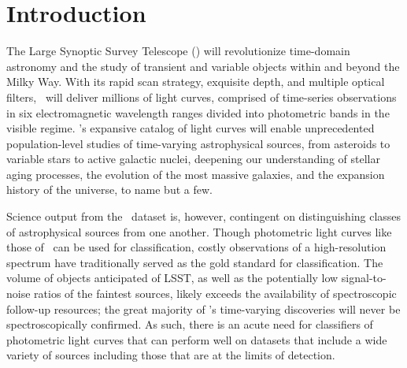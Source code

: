 \section{Introduction}
\label{sec:intro}

The Large Synoptic Survey Telescope (\lsst) will revolutionize time-domain astronomy and the study of transient and variable objects within and beyond the Milky Way.
With its rapid scan strategy, exquisite depth, and multiple optical filters, \lsst\ will deliver millions of light curves, comprised of time-series observations in six electromagnetic wavelength ranges divided into photometric bands in the visible regime.
\lsst's expansive catalog of light curves will enable unprecedented population-level studies of time-varying astrophysical sources, from asteroids to variable stars to active galactic nuclei, deepening our understanding of stellar aging processes, the evolution of the most massive galaxies, and the expansion history of the universe, to name but a few.

Science output from the \lsst\ dataset is, however, contingent on distinguishing classes of astrophysical sources from one another.
Though photometric light curves like those of \lsst\ can be used for classification, costly observations of a high-resolution spectrum have traditionally served as the gold standard for classification.
The volume of objects anticipated of LSST, as well as the potentially low signal-to-noise ratios of the faintest sources, likely exceeds the availability of spectroscopic follow-up resources; the great majority of \lsst's time-varying discoveries will never be spectroscopically confirmed.
As such, there is an acute need for classifiers of photometric light curves that can perform well on datasets that include a wide variety of sources including those that are at the limits of detection.


